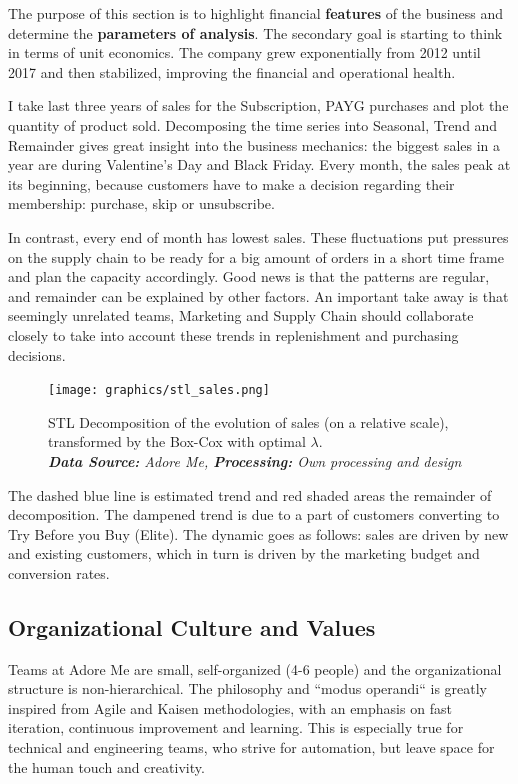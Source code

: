 \documentclass[12pt]{article}
\begin{document}
The purpose of this section is to highlight financial \textbf{features} of the business and determine the \textbf{parameters of analysis}. The secondary goal is starting to think in terms of unit economics. The company grew exponentially from 2012 until 2017 and then stabilized, improving the financial and operational health.

I take last three years of sales for the Subscription, PAYG purchases and plot the quantity of product sold. Decomposing the time series into Seasonal, Trend and Remainder gives great insight into the business mechanics: the biggest sales in a year are during Valentine's Day and Black Friday. Every month, the sales peak at its beginning, because customers have to make a decision regarding their membership: purchase, skip or unsubscribe. 

In contrast, every end of month has lowest sales. These fluctuations put pressures on the supply chain to be ready for a big amount of orders in a short time frame and plan the capacity accordingly. Good news is that the patterns are regular, and remainder can be explained by other factors. An important take away is that seemingly unrelated teams, Marketing and Supply Chain should collaborate closely to take into account these trends in replenishment and purchasing decisions.

\begin{figure}[!ht]
	\centering
	\texttt{[image: graphics/stl\_sales.png]}%
	\caption{STL Decomposition of the evolution of sales (on a relative scale), transformed by the Box-Cox with optimal $\lambda$.  \\
		\textit{\textbf{Data Source:} Adore Me, \textbf{Processing:} Own processing and design}}
\end{figure}

The dashed blue line is estimated trend and red shaded areas the remainder of decomposition. The dampened trend is due to a part of customers converting to Try Before you Buy (Elite). The dynamic goes as follows: sales are driven by new and existing customers, which in turn is driven by the marketing budget and conversion rates.



\subsection{Organizational Culture and Values}

Teams at Adore Me are small, self-organized (4-6 people) and the organizational structure is non-hierarchical. The philosophy and ``modus operandi`` is greatly inspired from Agile and Kaisen methodologies, with an emphasis on fast iteration, continuous improvement and learning. This is especially true for technical and engineering teams, who strive for automation, but leave space for the human touch and creativity.
\end{document}
